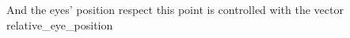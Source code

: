 \documentclass[preview]{standalone}
\begin{document}
\begin{center}
And the eyes' position respect this point is controlled with the vector relative\_eye\_position
\end{center}
\end{document}
